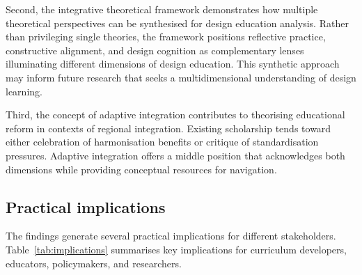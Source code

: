 \documentclass[ed]{acnsart}
\begin{document}
	Second, the integrative theoretical framework demonstrates how multiple theoretical perspectives can be synthesised for design education analysis. Rather than privileging single theories, the framework positions reflective practice, constructive alignment, and design cognition as complementary lenses illuminating different dimensions of design education. This synthetic approach may inform future research that seeks a multidimensional understanding of design learning.
	
	Third, the concept of adaptive integration contributes to theorising educational reform in contexts of regional integration. Existing scholarship tends toward either celebration of harmonisation benefits or critique of standardisation pressures. Adaptive integration offers a middle position that acknowledges both dimensions while providing conceptual resources for navigation.
	
	\subsection{Practical implications}
	
	The findings generate several practical implications for different stakeholders. Table~\ref{tab:implications} summarises key implications for curriculum developers, educators, policymakers, and researchers.
	
\end{document}
